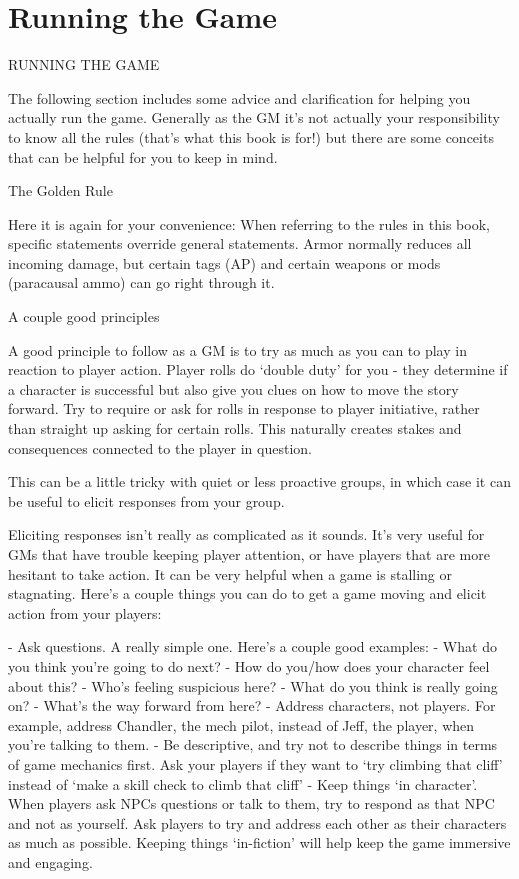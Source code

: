 \chapter{Running the Game}
RUNNING THE GAME

The following section includes some advice and clarification for helping you actually run the
game. Generally as the GM it’s not actually your responsibility to know all the rules (that’s what
this book is for!) but there are some conceits that can be helpful for you to keep in mind.


                                            The Golden Rule

Here it is again for your convenience: When referring to the rules in this book, specific
statements override general statements. Armor normally reduces all incoming damage, but
certain tags (AP) and certain weapons or mods (paracausal ammo) can go right through it.


                                       A couple good principles

A good principle to follow as a GM is to try as much as you can to play in reaction to player
action. Player rolls do ‘double duty’ for you - they determine if a character is successful but also
give you clues on how to move the story forward. Try to require or ask for rolls in response to
player initiative, rather than straight up asking for certain rolls. This naturally creates stakes and
consequences connected to the player in question.


This can be a little tricky with quiet or less proactive groups, in which case it can be useful to
elicit responses from your group.


Eliciting responses isn’t really as complicated as it sounds. It’s very useful for GMs that have
trouble keeping player attention, or have players that are more hesitant to take action. It can be
very helpful when a game is stalling or stagnating. Here’s a couple things you can do to get a
game moving and elicit action from your players:

            -   Ask questions. A really simple one. Here’s a couple good examples:
                     -   What do you think you’re going to do next?
                     -   How do you/how does your character feel about this?
                     -   Who’s feeling suspicious here?
                     -   What do you think is really going on?
                     -   What’s the way forward from here?
            -   Address characters, not players. For example, address Chandler, the mech
                 pilot, instead of Jeff, the player, when you’re talking to them.
            -    Be descriptive, and try not to describe things in terms of game mechanics first.
                Ask your players if they want to ‘try climbing that cliff’ instead of ‘make a skill
                check to climb that cliff’
            -    Keep things ‘in character’. When players ask NPCs questions or talk to them, try
                to respond as that NPC and not as yourself. Ask players to try and address each
                other as their characters as much as possible. Keeping things ‘in-fiction’ will help
                 keep the game immersive and engaging.


